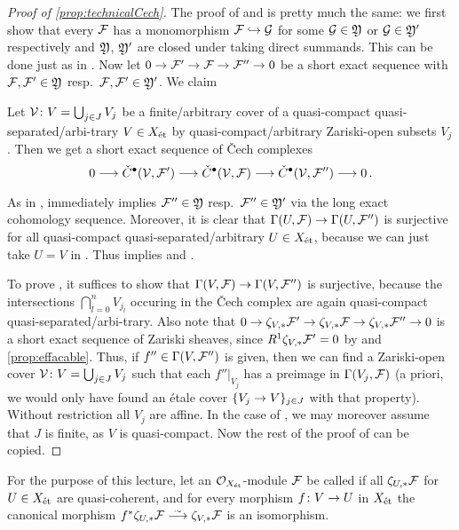 \documentclass[a4paper, 10pt, oneside, DIV=9, chapterprefix=true, numbers=enddot, bibliography=totoc]{scrbook}
\begin{document}
\begin{proof}[Proof of \cref{prop:technicalCech}]
	The proof of  and  is pretty much the same: we first show that every $\mathcal{F}$ has a monomorphism $\Ff\monomorphism \Gg$ for some $\mathcal{G}\in \mathfrak{Y}$ or $\mathcal{G}\in \mathfrak{Y}'$ respectively and $\mathfrak{Y}$, $\mathfrak{Y}'$ are closed under taking direct summands. This can be done just as in . Now let $0\morphism \Ff'\morphism \Ff\morphism \Ff''\morphism 0$ be a short exact sequence with $\mathcal{F},\mathcal{F}'\in \mathfrak{Y}$ resp.\ $\mathcal{F},\mathcal{F}'\in \mathfrak{Y}'$. We claim
	\begin{alphanumerate}
		\item[\itememph{*'}] Let $\mathcal{V}\colon V=\bigcup_{j\in J}V_j$ be a finite/arbitrary cover of a quasi-compact quasi-separated/arbi-trary $V\in X_{\mathrm{\acute{e}t}}$ by quasi-compact/arbitrary Zariski-open subsets $V_j$. Then we get a short exact sequence of \v Cech complexes
		\begin{equation*}
			0\morphism \check{C}^\bullet(\Vv,\Ff')\morphism \check{C}^\bullet(\Vv,\Ff)\morphism \check{C}^\bullet(\Vv,\Ff'')\morphism 0\,.
		\end{equation*}
	\end{alphanumerate}
	As in ,  immediately implies $\mathcal{F}''\in \mathfrak{Y}$ resp.\ $\mathcal{F}''\in \mathfrak{Y}'$ via the long exact cohomology sequence. Moreover, it is clear that $\Global(U,\Ff)\morphism \Global(U,\Ff'')$ is surjective for all quasi-compact quasi-separated/arbitrary $U\in X_{\mathrm{\acute{e}t}}$, because we can just take $U=V$ in . Thus  implies  and .
	
	To prove , it suffices to show that $\Global(V,\Ff)\morphism \Global(V,\Ff'')$ is surjective, because the intersections $\bigcap_{l=0}^nV_{j_l}$ occuring in the \v Cech complex are again quasi-compact quasi-separated/arbi-trary. Also note that $0\morphism \zeta_{V,*}\Ff'\morphism \zeta_{V,*}\Ff\morphism \zeta_{V,*}\Ff''\morphism 0$ is a short exact sequence of Zariski sheaves, since $R^1\zeta_{V,*}\mathcal{F}'=0$ by  and \cref{prop:effacable}. Thus, if $f''\in \operatorname{\Gamma}(V,\mathcal{F}'')$ is given, then we can find a Zariski-open cover $\mathcal{V}\colon V=\bigcup_{j\in J}V_j$ such that each $f''|_{V_j}$ has a preimage in $\operatorname{\Gamma}(V_j,\mathcal{F})$ (a priori, we would only have found an étale cover $\{V_j\morphism V\}_{j\in J}$ with that property). Without restriction all $V_j$ are affine. In the case of , we may moreover assume that $J$ is finite, as $V$ is quasi-compact. Now the rest of the proof of  can be copied.
\end{proof}
\begin{defi}
	For the purpose of this lecture, let an $\mathcal{O}_{X_{\mathrm{\acute{e}t}}}$-module $\mathcal{F}$ be called  if all $\zeta_{U,*}\mathcal{F}$ for $U\in X_{\mathrm{\acute{e}t}}$ are quasi-coherent, and for every morphism $f\colon V\morphism U$ in $X_{\mathrm{\acute{e}t}}$ the canonical morphism $f^*\zeta_{U,*}\Ff\isomorphism \zeta_{V,*}\Ff$ is an isomorphism.%
\end{defi}
\end{document}

